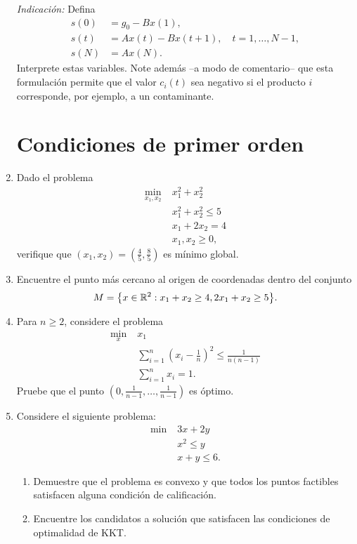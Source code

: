 \documentclass{article}
\begin{document}
\begin{enumerate}
		\textit{Indicación:} Defina
		\begin{align*}
			s(0) &= g_0 - B x(1), \\
			s(t) &= Ax(t) - Bx(t+1), \quad t = 1, \dots, N-1, \\
			s(N) &= Ax(N).
		\end{align*}
		Interprete estas variables. Note además --a modo de comentario-- que esta formulación permite que el valor \(c_i(t)\) sea negativo si el producto \(i\) corresponde, por ejemplo, a un contaminante.

\section{Condiciones de primer orden}

	\item Dado el problema
		\begin{align*}
			\min_{x_1, x_2} \; & x_1^2 + x_2^2 \\
					   & x_1^2 + x_2^2 \leq 5 \\
					   & x_1 + 2x_2 = 4 \\
					   &x_1, x_2 \geq 0,
		\end{align*}
		verifique que \((x_1, x_2) = \left(\frac{4}{5}, \frac{8}{5}\right)\) es mínimo global.
	\item Encuentre el punto más cercano al origen de coordenadas dentro del conjunto
		\[
			M = \qty{x \in \mathbb{R}^2 : x_1 + x_2 \geq 4, 2x_1 + x_2 \geq 5}.
		\]
	\item Para \(n \geq 2\), considere el problema
		\begin{align*}
			\min_{x} \; & x_1 \\
				    & \sum_{i=1}^n \left(x_i - \frac{1}{n}\right)^2 \leq \frac{1}{n(n-1)} \\
				    & \sum_{i=1}^n x_i = 1.
		\end{align*}
		Pruebe que el punto \(\left(0, \frac{1}{n-1}, \dots, \frac{1}{n-1}\right)\) es óptimo.
	\item Considere el siguiente problema:
		\begin{align*}
			\min \; & 3x + 2y \\
				& x^2 \leq y \\
				& x + y \leq 6.
		\end{align*}
		\begin{enumerate}
			\item Demuestre que el problema es convexo y que todos los puntos factibles satisfacen alguna condición de calificación.
			\item Encuentre los candidatos a solución que satisfacen las condiciones de optimalidad de KKT.

\end{enumerate}
\end{enumerate}
\end{document}
